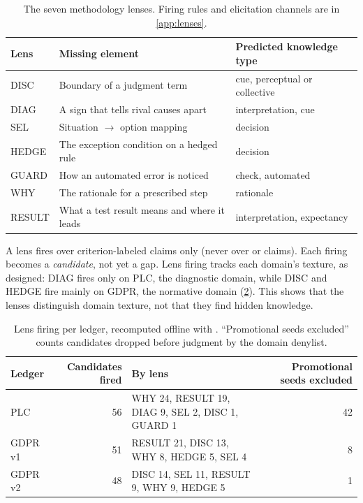 \begin{table}[tbp]
  \centering
  \small
  \caption{The seven methodology lenses. Firing rules and elicitation channels are in
  \cref{app:lenses}.}
  \label{tab:n3-lenses}
  \begin{tabularx}{\linewidth}{@{}lXX@{}}
    \toprule
    Lens & Missing element & Predicted knowledge type \\
    \midrule
    DISC & Boundary of a judgment term & cue, perceptual or collective \\
    DIAG & A sign that tells rival causes apart & interpretation, cue \\
    SEL & Situation $\rightarrow$ option mapping & decision \\
    HEDGE & The exception condition on a hedged rule & decision \\
    GUARD & How an automated error is noticed & check, automated \\
    WHY & The rationale for a prescribed step & rationale \\
    RESULT & What a test result means and where it leads & interpretation, expectancy \\
    \bottomrule
  \end{tabularx}
\end{table}

A lens fires over criterion-labeled claims only (never over  or
 claims). Each firing becomes a \emph{candidate}, not yet a gap. \evobs{} Lens firing
tracks each domain's texture, as designed: DIAG fires only on PLC, the diagnostic domain, while DISC
and HEDGE fire mainly on GDPR, the normative domain (\cref{tab:n3-firing}). This shows that the lenses
distinguish domain texture, not that they find hidden knowledge.

\begin{table}[tbp]
  \centering
  \small
  \caption{Lens firing per ledger, recomputed offline with .
  \enquote{Promotional seeds excluded} counts candidates dropped before judgment by the domain
  denylist.}
  \label{tab:n3-firing}
  \begin{tabularx}{\linewidth}{@{}lrXr@{}}
    \toprule
    Ledger & Candidates fired & By lens & Promotional seeds excluded \\
    \midrule
    PLC & 56 & WHY 24, RESULT 19, DIAG 9, SEL 2, DISC 1, GUARD 1 & 42 \\
    GDPR v1 & 51 & RESULT 21, DISC 13, WHY 8, HEDGE 5, SEL 4 & 8 \\
    GDPR v2 & 48 & DISC 14, SEL 11, RESULT 9, WHY 9, HEDGE 5 & 1 \\
    \bottomrule
  \end{tabularx}
\end{table}

